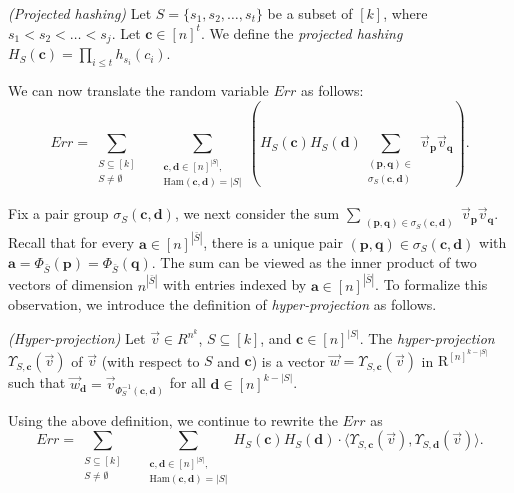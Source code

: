 \def\draft{0}  \documentclass[proceedings]{stacs}
\theoremstyle{plain}\newtheorem{satz}[thm]{Satz}
\theoremstyle{definition}\newtheorem{crucial}[thm]{Crucial Definition}
\newcommand{\vecv}{{\vec{v}} }
\newcommand{\barS}{{\bar{S}} }
\newcommand{\bfp}{{\mathbf p} }
\newcommand{\bfq}{{\mathbf q} }
\newcommand{\bfa}{{\mathbf a} }
\newcommand{\bfc}{{\mathbf c} }
\newcommand{\bfd}{{\mathbf d} }
\begin{document}
\begin{definition}\label{def:projectedhashing} \emph{(Projected hashing)}
Let $S = \{s_1, s_2, \dots, s_t\}$ be a subset of $[k]$, where $s_1 < s_2 < \dots < s_j$.
Let $\bfc\in [n]^t$. We define the \emph{projected hashing} $H_S(\bfc) = \prod_{i \leq t}h_{s_i}(c_i)$.
\end{definition}
We can now translate the random variable $Err$ as follows:
\begin{equation}\label{eq: outside ht eprojected pairs}
Err = \sum_{\substack{S \subseteq [k] \\S \neq \emptyset}}\ \ \ \ \  \sum_{\substack{\bfc,\bfd \in [n]^{|S|},\\ \mathrm{Ham}(\bfc, \bfd) = |S|}} \left( H_S(\bfc)H_S(\bfd)  \sum_{\substack{(\bfp,\bfq) \in \\ \sigma_S(\bfc,\bfd)}} \vecv_{\bfp}\vecv_{\bfq} \right).
\end{equation}

Fix a pair group $\sigma_S(\bfc,\bfd)$, we next consider the sum $\sum_{\substack{(\bfp,\bfq) \in \sigma_S(\bfc,\bfd)}} \vecv_{\bfp}\vecv_{\bfq}$. Recall that for every $\bfa \in [n]^{|\barS|}$, there is a unique pair $(\bfp,\bfq) \in \sigma_S(\bfc,\bfd)$ with $\bfa = \Phi_{\barS}(\bfp) = \Phi_{\barS}(\bfq)$. The sum can be viewed as the inner product of two vectors of dimension $n^{|\barS|}$ with entries indexed by $\bfa \in [n]^{|\barS|}$. To formalize this observation, we introduce the definition of \emph{hyper-projection} as follows.

\begin{definition}\label{def:hyperproj} \emph{(Hyper-projection)} Let $\vecv \in R^{n^k}$, $S \subseteq [k]$, and $\mathbf \bfc \in [n]^{|S|}$. The \emph{hyper-projection} $\Upsilon_{S,\bfc}(\vecv)$ of $\vecv$ (with respect to $S$ and $\bfc$) is a vector $\vec{w} = \Upsilon_{S,\bfc}(\vecv)$ in $\mathrm R^{[n]^{k - |S|}}$ such that $\vec{w}_{\bfd} = \vecv_{\Phi^{-1}_S(\bfc, \bfd)}$ for all $\bfd \in [n]^{k - |S|}$.
\end{definition}

Using the above definition, we continue to rewrite the $Err$ as
\begin{equation}\label{eq: turn_to_inner_prod}
Err = \sum_{\substack{S \subseteq [k] \\S \neq \emptyset}}\ \ \ \ \  \sum_{\substack{\bfc,\bfd \in [n]^{|S|},\\ \mathrm{Ham}(\bfc, \bfd) = |S|}}  H_S(\bfc)H_S(\bfd) \cdot \langle \Upsilon_{S,\bfc}(\vecv),   \Upsilon_{S,\bfd}(\vecv) \rangle .
\end{equation}
\end{document}
